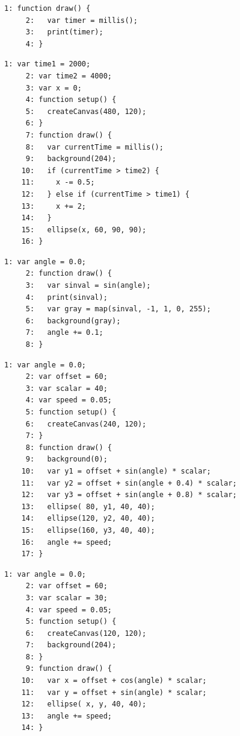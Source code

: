 \documentclass[a4j]{ltjsarticle}
\begin{document}
\vspace{1in}
\begin{lstlisting}[caption=Ex\_08\_10.js]
     1: function draw() {
     2:   var timer = millis();
     3:   print(timer);
     4: }
\end{lstlisting}
\vspace{1in}
\begin{lstlisting}[caption=Ex\_08\_11.js]
     1: var time1 = 2000;
     2: var time2 = 4000;
     3: var x = 0;
     4: function setup() {
     5:   createCanvas(480, 120);
     6: }
     7: function draw() {
     8:   var currentTime = millis();
     9:   background(204);
    10:   if (currentTime > time2) {
    11:     x -= 0.5;
    12:   } else if (currentTime > time1) {
    13:     x += 2;
    14:   }
    15:   ellipse(x, 60, 90, 90);
    16: }
\end{lstlisting}
\vspace{1in}
\begin{lstlisting}[caption=Ex\_08\_12.js]
     1: var angle = 0.0;
     2: function draw() {
     3:   var sinval = sin(angle);
     4:   print(sinval);
     5:   var gray = map(sinval, -1, 1, 0, 255);
     6:   background(gray);
     7:   angle += 0.1;
     8: }
\end{lstlisting}
\vspace{1in}
\begin{lstlisting}[caption=Ex\_08\_13.js]
     1: var angle = 0.0;
     2: var offset = 60;
     3: var scalar = 40;
     4: var speed = 0.05;
     5: function setup() {
     6:   createCanvas(240, 120);
     7: }
     8: function draw() {
     9:   background(0);
    10:   var y1 = offset + sin(angle) * scalar;
    11:   var y2 = offset + sin(angle + 0.4) * scalar;
    12:   var y3 = offset + sin(angle + 0.8) * scalar;
    13:   ellipse( 80, y1, 40, 40);
    14:   ellipse(120, y2, 40, 40);
    15:   ellipse(160, y3, 40, 40);
    16:   angle += speed;
    17: }
\end{lstlisting}
\vspace{1in}
\begin{lstlisting}[caption=Ex\_08\_14.js]
     1: var angle = 0.0;
     2: var offset = 60;
     3: var scalar = 30;
     4: var speed = 0.05;
     5: function setup() {
     6:   createCanvas(120, 120);
     7:   background(204);
     8: }
     9: function draw() {
    10:   var x = offset + cos(angle) * scalar;
    11:   var y = offset + sin(angle) * scalar;
    12:   ellipse( x, y, 40, 40);
    13:   angle += speed;
    14: }
\end{lstlisting}
\end{document}
